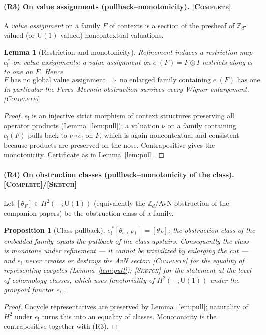 \documentclass[11pt]{article}
\newtheorem{lemma}{Lemma}
\newtheorem{proposition}{Proposition}
\theoremstyle{definition}
\theoremstyle{remark}
\newcommand{\U}{\mathrm{U}}
\newcommand{\pushf}[1]{{#1}_{!}}
\newcommand{\STC}{{\normalfont\textsc{[Complete]}}}
\newcommand{\STS}{{\normalfont\textsc{[Sketch]}}}
\begin{document}
\paragraph{(R3) On value assignments (pullback--monotonicity). \STC}
A \emph{value assignment} on a family $F$ of contexts is a section of the presheaf of
$\mathbb Z_d$-valued (or $\U(1)$-valued) noncontextual valuations.

\begin{lemma}[Restriction and monotonicity]\label{lem:mono}
Refinement induces a restriction map $\pushf e^{\,\ast}$ on value assignments: a value
assignment on $\pushf e(F)=F\otimes I$ restricts along $\pushf e$ to one on $F$. Hence
\[
\text{$F$ has no global value assignment}\ \Longrightarrow\
\text{no enlarged family containing $\pushf e(F)$ has one.}
\]
In particular the Peres--Mermin obstruction survives every Wigner enlargement. \STC
\end{lemma}
\begin{proof}
$\pushf e$ is an injective strict morphism of context structures preserving all
operator products (Lemma~\ref{lem:pull}); a valuation $\nu$ on a family containing
$\pushf e(F)$ pulls back to $\nu\circ\pushf e$ on $F$, which is again noncontextual and
consistent because products are preserved on the nose. Contrapositive gives the
monotonicity. Certificate as in Lemma~\ref{lem:pull}. \end{proof}

\paragraph{(R4) On obstruction classes (pullback--monotonicity of the class). \STC/\STS}
Let $[\theta_F]\in H^2(-;\U(1))$ (equivalently the $\mathbb Z_d$/AvN obstruction of the
companion papers) be the obstruction class of a family.

\begin{proposition}[Class pullback]\label{prop:classpull}
$\pushf e^{\,\ast}[\theta_{\pushf e(F)}]=[\theta_F]$: the obstruction class of the
embedded family equals the pullback of the class upstairs. Consequently the class is
\emph{monotone} under refinement --- it cannot be trivialized by enlarging the cut ---
and $\pushf e$ never creates or destroys the AvN sector. \STC{} for the equality of
representing cocycles (Lemma~\ref{lem:pull}); \STS{} for the statement at the level of
cohomology classes, which uses functoriality of $H^2(-;\U(1))$ under the groupoid
functor $\pushf e$ \cite[naturality of group/groupoid cohomology]{Brown,Weibel}.
\end{proposition}
\begin{proof}
Cocycle representatives are preserved by Lemma~\ref{lem:pull}; naturality of $H^2$
under $\pushf e$ turns this into an equality of classes. Monotonicity is the
contrapositive together with (R3). \end{proof}
\end{document}
